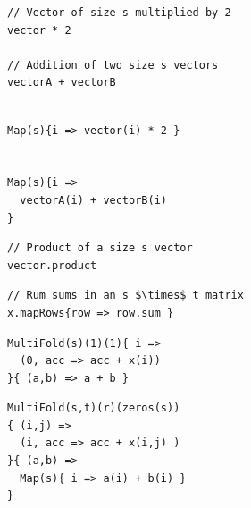 \begin{figure}
\centering

\newsavebox{\MapHLL}
\begin{lrbox}{\MapHLL}
\begin{lstlisting}[language=PPLTable]
// Vector of size s multiplied by 2
vector * 2

// Addition of two size s vectors
vectorA + vectorB
\end{lstlisting}
\end{lrbox}

\newsavebox{\MapPPL}
\begin{lrbox}{\MapPPL}
\begin{lstlisting}[language=PPLTable]

Map(s){i => vector(i) * 2 }


Map(s){i =>
  vectorA(i) + vectorB(i)
}
\end{lstlisting}
\end{lrbox}

\newsavebox{\MultiFoldHLLOne}
\begin{lrbox}{\MultiFoldHLLOne}
\begin{lstlisting}[language=PPLTable]
// Product of a size s vector
vector.product

\end{lstlisting}
\end{lrbox}

\newsavebox{\MultiFoldHLLTwo}
\begin{lrbox}{\MultiFoldHLLTwo}
\begin{lstlisting}[language=PPLTable]
// Rum sums in an s $\times$ t matrix
x.mapRows{row => row.sum }

\end{lstlisting}
\end{lrbox}

\newsavebox{\MultiFoldPPLOne}
\begin{lrbox}{\MultiFoldPPLOne}
\begin{lstlisting}[language=PPLTable]
MultiFold(s)(1)(1){ i =>
  (0, acc => acc + x(i))
}{ (a,b) => a + b }
\end{lstlisting}
\end{lrbox}

\newsavebox{\MultiFoldPPLTwo}
\begin{lrbox}{\MultiFoldPPLTwo}
\begin{lstlisting}[language=PPLTable]
MultiFold(s,t)(r)(zeros(s))
{ (i,j) =>
  (i, acc => acc + x(i,j) )
}{ (a,b) =>
  Map(s){ i => a(i) + b(i) }
}
\end{lstlisting}
\end{lrbox}


\end{figure}

